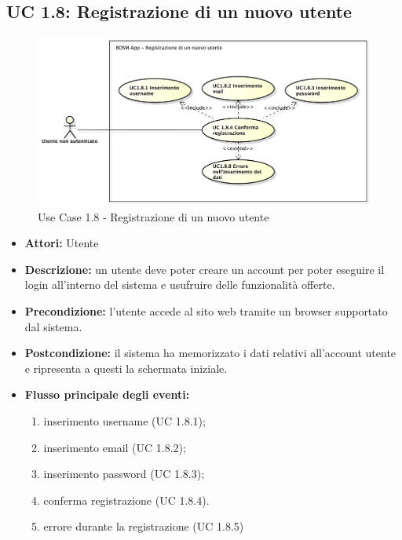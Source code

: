 \subsection{UC 1.8: Registrazione di un nuovo utente}

\begin{figure}[!htbp]
    \centering
    \centerline{\includegraphics[scale=0.45]{./images/UC1_8.pdf}}
    \caption{Use Case 1.8 - Registrazione di un nuovo utente}
\end{figure}

\begin{itemize}
    \item \textbf{Attori:} Utente
    \item \textbf{Descrizione:} un utente deve poter creare un account per poter eseguire il login
    all’interno del sistema e usufruire delle funzionalità offerte.
    \item \textbf{Precondizione:} l'utente accede al sito web tramite un browser supportato
    dal sistema.
    \item \textbf{Postcondizione:} il sistema ha memorizzato i dati relativi all’account utente e
    ripresenta a questi la schermata iniziale.
    \item \textbf{Flusso principale degli eventi:}

    \begin{enumerate}
        \item inserimento username (UC 1.8.1);
        \item inserimento email (UC 1.8.2);
        \item inserimento password (UC 1.8.3);
        \item conferma registrazione (UC 1.8.4).
        \item errore durante la registrazione (UC 1.8.5)
    \end{enumerate}

\end{itemize}

